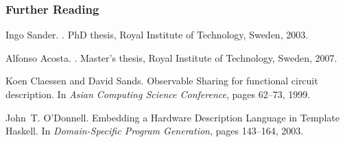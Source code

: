 \documentclass{beamer}
\begin{document}
\begin{frame}
  \frametitle<presentation>{Further Reading}
    
    

 
    

  
%  
%  
\beamerdefaultoverlayspecification{}
\begin{thebibliography}{1}

Ingo Sander.
.
\newblock PhD thesis, Royal Institute of Technology, Sweden, 2003.

Alfonso Acosta.
.
\newblock Master's thesis, Royal Institute of Technology, Sweden, 2007.

Koen Claessen and David Sands.
\newblock Observable Sharing for functional circuit description.
\newblock In {\em Asian Computing Science Conference}, pages 62--73, 1999.


John~T. O'Donnell.
\newblock Embedding a Hardware Description Language in Template Haskell.
\newblock In {\em Domain-Specific Program Generation}, pages 143--164, 2003.



\end{thebibliography}


\end{frame}
\end{document}
